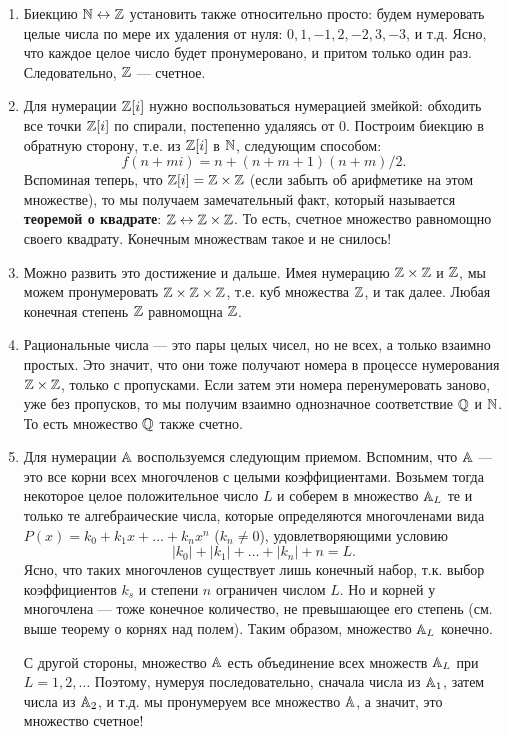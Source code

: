 \begin{enumerate}
\item Биекцию $\mathbb N\leftrightarrow\mathbb Z$ установить также относительно просто: будем нумеровать целые числа по мере их удаления от нуля: $0, 1, -1, 2, -2, 3, -3$, и т.д. Ясно, что каждое целое число будет пронумеровано, и притом только один раз. Следовательно, $\mathbb Z$ --- счетное.
\item Для нумерации $\mathbb Z[i]$ нужно воспользоваться нумерацией змейкой: обходить все точки $\mathbb Z[i]$ по спирали, постепенно удаляясь от 0. Построим биекцию в обратную сторону, т.е. из $\mathbb Z[i]$ в $\mathbb N$, следующим способом:
$$
f(n+mi) = n+(n+m+1)(n+m)/2.
$$
Вспоминая теперь, что $\mathbb Z[i]=\mathbb Z\times\mathbb Z$ (если забыть об арифметике на этом множестве), то мы получаем замечательный факт, который называется \textbf{теоремой о квадрате}: $\mathbb Z\leftrightarrow\mathbb Z\times \mathbb Z$. То есть, счетное множество равномощно своего квадрату. Конечным множествам такое и не снилось!
\item Можно развить это достижение и дальше. Имея нумерацию $\mathbb Z\times\mathbb Z$ и $\mathbb Z$, мы можем пронумеровать $\mathbb Z\times\mathbb Z\times\mathbb Z$, т.е. куб множества $\mathbb Z$, и так далее. Любая конечная степень $\mathbb Z$ равномощна $\mathbb Z$.
\item Рациональные числа --- это пары целых чисел, но не всех, а только взаимно простых. Это значит, что они тоже получают номера в процессе нумерования $\mathbb Z\times\mathbb Z$, только с пропусками. Если затем эти номера перенумеровать заново, уже без пропусков, то мы получим взаимно однозначное соответствие $\mathbb Q$ и $\mathbb N$. То есть множество $\mathbb Q$ также счетно.
\item Для нумерации $\mathbb A$ воспользуемся следующим приемом. Вспомним, что $\mathbb A$ --- это все корни всех многочленов с целыми коэффициентами. Возьмем тогда некоторое целое положительное число $L$ и соберем в множество $\mathbb A_L$ те и только те алгебраические числа, которые определяются многочленами вида $P(x)=k_0+k_1x+\dots+k_nx^n$ ($k_n\ne 0$), удовлетворяющими условию
$$
|k_0|+|k_1|+\dots+|k_n|+n=L.
$$
Ясно, что таких многочленов существует лишь конечный набор, т.к. выбор коэффициентов $k_s$ и степени $n$ ограничен числом $L$. Но и корней у многочлена --- тоже конечное количество, не превышающее его степень (см. выше теорему о корнях над полем). Таким образом, множество $\mathbb A_L$ конечно.

С другой стороны, множество $\mathbb A$ есть объединение всех множеств $\mathbb A_L$ при $L=1,2,\dots$ Поэтому, нумеруя последовательно, сначала числа из $\mathbb A_1$, затем числа из $\mathbb A_2$, и т.д. мы пронумеруем все множество $\mathbb A$, а значит, это множество счетное!


\end{enumerate}
